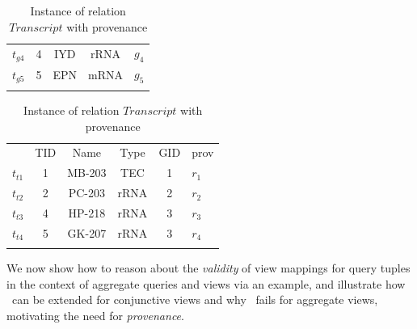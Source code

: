 \begin{table}[htp]
\begin{tabular}[t]{c|c|c|c||b|}
$t_{g4}$&4&IYD&rRNA&$g_4$\\ \hhline{~----}
$t_{g5}$&5&EPN&mRNA&$g_5$\\ \hhline{~----}
\end{tabular}
\bigskip
\caption{Instance of relation $Transcript$ with provenance}\label{Instance of Transcript}
\begin{tabular}[t]{c|c|c|c|c||b|} \hhline{~-----}
&TID&Name&Type&GID&prov\\ \hhline{~-----}
$t_{t1}$&1&MB-203&TEC&1&$r_1$\\ \hhline{~-----}
$t_{t2}$&2&PC-203&rRNA&2&$r_2$\\ \hhline{~-----}
$t_{t3}$&4&HP-218&rRNA&3&$r_3$\\ \hhline{~-----}
$t_{t4}$&5&GK-207&rRNA&3&$r_4$\\ \hhline{~-----}
\end{tabular}
\end{table}



We now show how to reason about the {\em validity} of view mappings for query tuples in the context of aggregate queries and  views via an example, and illustrate how \rba\ can be extended for conjunctive views and why \rba\ fails for aggregate views, motivating the need for {\em provenance}.




